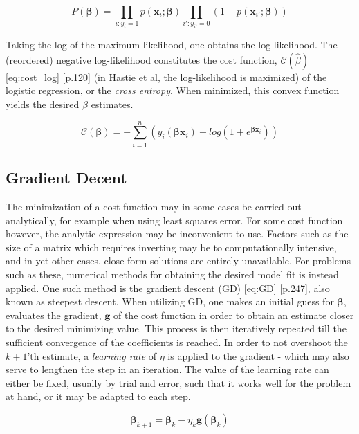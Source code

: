 \documentclass[%
oneside,                 %
final,                   %
10pt]{article}
\begin{document}
\begin{equation}
P(\bm{\beta})=\displaystyle\prod_{i:y_i=1}p(\bm{x}_i; \bm{\beta}) \displaystyle\prod_{i':y_{i'}=0}(1-p(\bm{x}_{i'}; \bm{\beta}))
\label{eq:max_likelihood}
\end{equation}

Taking the log of the maximum likelihood, one obtains the log-likelihood. The (reordered) negative log-likelihood constitutes the cost function, $\mathcal{C}(\hat {{\beta}})$ \eqref{eq:cost_log} \citep{HastieTrevor2009TEoS}[p.120] (in Hastie et al, the log-likelihood is maximized) of the logistic regression, or the \textit{cross entropy}. When minimized, this convex function yields the desired $\beta$ estimates.

\begin{equation}
\mathcal{C}(\bm{\beta})=-\sum_{i=1}^n \left(y_i({\bm{\beta}}\bm{x}_i)-log(1+e^{{\bm{\beta}}\bm{x}_i})\right)
\label{eq:cost_log}
\end{equation}

\subsection{Gradient Decent}
The minimization of a cost function may in some cases be carried out analytically, for example when using least squares error. For some cost function however, the analytic expression may be inconvenient to use. Factors such as the size of a matrix which requires inverting may be to computationally intensive, and in yet other cases, close form solutions are entirely unavailable. For problems such as these, numerical methods for obtaining the desired model fit is instead applied. One such method is the gradient descent (GD) \eqref{eq:GD} \citep{MLMurphy}[p.247], also known as steepest descent. When utilizing GD, one makes an initial guess for $\bm{\beta}$, evaluates the gradient, $\bm g$ of the cost function in order to obtain an estimate closer to the desired minimizing value. This process is then iteratively repeated till the sufficient convergence of the coefficients is reached. In order to not overshoot the $k+1$'th estimate, a \textit{learning rate} of $\eta$ is applied to the gradient - which may also serve to lengthen the step in an iteration. The value of the learning rate can either be fixed, usually by trial and error, such that it works well for the problem at hand, or it may be adapted to each step. 

\begin{equation}
\bm{\beta}_{k+1}=\bm{\beta}_{k}-\eta_k  \bm g (\bm{\beta}_k)
\label{eq:GD}
\end{equation}
\end{document}
